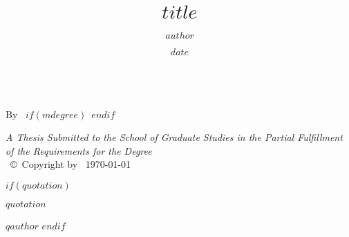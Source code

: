 \documentclass[
11pt, %
oneside, %
english, %
singlespacing, %
]{macthesis} %
\title{$title$}
\author{$author$}
\date{$date$}
\def\blankpage{%
      \clearpage%
      \thispagestyle{empty}%
      \addtocounter{page}{-1}%
      \null%
      \clearpage}
\begin{document}
\frontmatter %

\pagestyle{plain} %

\vspace{6cm}
\begin{center}
\ttitle
\end{center}
\clearpage

\begin{center}

\vfill
\textsc{\Large \ttitle} \\

\vfill
{By \authorname\, \bdeg $if(mdegree)$\, \mdeg $endif$}


 \vfill
{\large \textit{A Thesis Submitted to the School of Graduate Studies in the Partial Fulfillment of the Requirements for the Degree \degreename}}\\

\vfill
{\large \univname\, \copyright\, Copyright by \authorname\, \today}\\[4cm] %

\end{center}
\blankpage
\clearpage


$if(quotation)$
\vspace*{0.2\textheight}

\noindent\itshape $quotation$\bigbreak

\hfill\textemdash $qauthor$
$endif$
\end{document}
